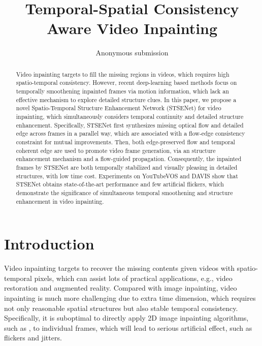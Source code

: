 \documentclass[letterpaper]{article} %
\title{Temporal-Spatial Consistency Aware Video Inpainting }
\author{Anonymous submission}
\begin{document}
\maketitle

\begin{abstract}
	Video inpainting targets to fill the missing regions in videos, which requires high spatio-temporal consistency.
	However, recent deep-learning based methods focus on temporally smoothening inpainted frames via motion information, which lack an effective mechanism to explore detailed structure clues.
	In this paper, we propose a novel Spatio-Temporal Structure Enhancement Network (STSENet) for video inpainting, which simultaneously considers temporal continuity and detailed structure enhancement. 
	Specifically, STSENet first synthesizes missing optical flow and detailed edge across frames in a parallel way, which are associated with a flow-edge consistency constraint for mutual improvements.
	Then, both edge-preserved flow and temporal coherent edge are used to promote video frame generation, via an structure enhancement mechanism and a flow-guided propagation.
	Consequently, the inpainted frames by STSENet are both temporally stabilized and visually pleasing in detailed structures, with low time cost. 
	Experiments on YouTubeVOS and DAVIS show that STSENet obtains state-of-the-art performance and few artificial flickers, which demonstrate the significance of simultaneous temporal smoothening and structure enhancement in video inpainting.
	
\end{abstract}




\section{Introduction}
\noindent Video inpainting targets to recover the missing contents given videos with spatio-temporal pixels, which can assist lots of practical applications, e.g., video restoration and augmented reality. Compared with image inpainting, video inpainting is much more challenging due to extra time dimension, which requires not only reasonable spatial structures but also stable temporal consistency. Specifically, it is suboptimal to directly apply 2D image inpainting algorithms, such as \cite{yu2018free,Xiong_2019_CVPR}, to individual frames, which will lead to serious artificial effect, such as flickers and jitters. 
\end{document}

